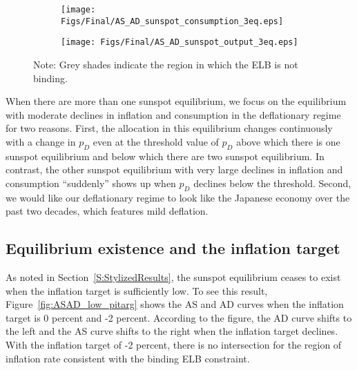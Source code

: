 \documentclass[11pt]{article}
\begin{document}
\begin{singlespace}
		\begin{figure}[h]
			\caption{AD and AS Curves in the Deflationary Regime\\---Low $p_D$---} \label{fig:ASAD_low_pD}
            \vspace{-1em}
			\begin{center}
				\begin{subfigure}[b]{0.4\textwidth}
					\centering
					\texttt{[image: Figs/Final/AS\_AD\_sunspot\_consumption\_3eq.eps]}
				\end{subfigure}
				\hspace{0.5cm}
				\begin{subfigure}[b]{0.4\textwidth}
					\centering
					\texttt{[image: Figs/Final/AS\_AD\_sunspot\_output\_3eq.eps]}
				\end{subfigure}
			\end{center}
	        \vspace{-1em}
			{\footnotesize Note: Grey shades indicate the region in which the ELB is not binding.}
		\end{figure}

		When there are more than one sunspot equilibrium, we focus on the equilibrium with moderate declines in inflation and consumption in the deflationary regime for two reasons. First, the allocation in this equilibrium changes continuously with a change in $p_{D}$ even at the threshold value of $p_{D}$ above which there is one sunspot equilibrium and below which there are two sunspot equilibrium. In contrast, the other sunspot equilibrium with very large declines in inflation and consumption ``suddenly'' shows up when $p_{D}$ declines below the threshold. Second, we would like our deflationary regime to look like the Japanese economy over the past two decades, which features mild deflation.

		\subsection{Equilibrium existence and the inflation target}

		As noted in Section~\ref{S:StylizedResults}, the sunspot equilibrium ceases to exist when the inflation target is sufficiently low. To see this result, Figure~\ref{fig:ASAD_low_pitarg} shows the AS and AD curves when the inflation target is 0 percent and -2 percent. According to the figure, the AD curve shifts to the left and the AS curve shifts to the right when the inflation target declines. With the inflation target of -2 percent, there is no intersection for the region of inflation rate consistent with the binding ELB constraint.


\end{singlespace}
\end{document}
